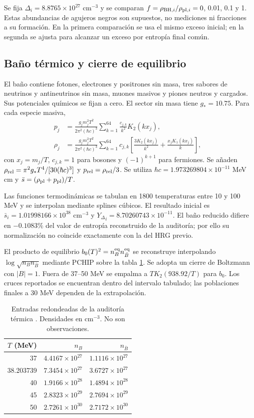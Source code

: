 \documentclass[10pt,twocolumn,a4paper]{article}
\newcommand{\Y}{{Y_\Delta}}
\newcommand{\sbar}{\bar s}
\begin{document}
Se fija $\Delta_i=8.8765\times10^{27}$ cm$^{-3}$ y se comparan $f=\rho_{{\rm BH},i}/\rho_{{\rm pl},i}=0$, 0.01, 0.1 y 1. Estas abundancias de agujeros negros son supuestos, no mediciones ni fracciones a su formación. En la primera comparación se usa el mismo exceso inicial; en la segunda se ajusta para alcanzar un exceso por entropía final común.

\subsection{Baño térmico y cierre de equilibrio}
El baño contiene fotones, electrones y positrones sin masa, tres sabores de neutrinos y antineutrinos sin masa, muones masivos y piones neutros y cargados. Sus potenciales químicos se fijan a cero. El sector sin masa tiene $g_*=10.75$. Para cada especie masiva,
\begin{align}
p_j&=\frac{g_jm_j^2T^2}{2\pi^2(\hbar c)^3}
\sum_{k=1}^{64}\frac{c_{j,k}}{k^2}K_2(kx_j),\\
\rho_j&=\frac{g_jm_j^2T^2}{2\pi^2(\hbar c)^3}
\sum_{k=1}^{64}c_{j,k}\left[\frac{3K_2(kx_j)}{k^2}+\frac{x_jK_1(kx_j)}{k}\right],
\end{align}
con $x_j=m_j/T$, $c_{j,k}=1$ para bosones y $(-1)^{k+1}$ para fermiones. Se añaden $\rho_{\rm rel}=\pi^2g_*T^4/[30(\hbar c)^3]$ y $p_{\rm rel}=\rho_{\rm rel}/3$. Se utiliza $\hbar c=1.973269804\times10^{-11}$ MeV cm y $\sbar=(\rho_{\rm pl}+p_{\rm pl})/T$.

Las funciones termodinámicas se tabulan en 1800 temperaturas entre 10 y 100 MeV y se interpolan mediante splines cúbicos. El resultado inicial es $\sbar_i=1.01998166\times10^{38}$ cm$^{-3}$ y $\Y_i=8.70260743\times10^{-11}$. El baño reducido difiere en $-0.1083\%$ del valor de entropía reconstruido de la auditoría; por ello su normalización no coincide exactamente con la del HRG previo.

El producto de equilibrio $b_0(T)^2=n_B^{\rm eq}n_{\bar B}^{\rm eq}$ se reconstruye interpolando $\log\sqrt{n_Bn_{\bar B}}$ mediante PCHIP sobre la tabla \ref{tab:input}. Se adopta un cierre de Boltzmann con $|B|=1$. Fuera de 37--50 MeV se empalma a $T K_2(938.92/T)$ para $b_0$. Los cruces reportados se encuentran dentro del intervalo tabulado; las poblaciones finales a 30 MeV dependen de la extrapolación.

\begin{table}[t]
\centering\small
\caption{Entradas redondeadas de la auditoría térmica \cite{garcia}. Densidades en cm$^{-3}$. No son observaciones.}\label{tab:input}
\begin{tabular}{rrr}\toprule
$T$ (MeV)&$n_B$&$n_{\bar B}$\\\midrule
37&$4.4167\times10^{27}$&$1.1116\times10^{27}$\\
38.203739&$7.3454\times10^{27}$&$3.6727\times10^{27}$\\
40&$1.9166\times10^{28}$&$1.4894\times10^{28}$\\
45&$2.8323\times10^{29}$&$2.7694\times10^{29}$\\
50&$2.7261\times10^{30}$&$2.7172\times10^{30}$\\\bottomrule
\end{tabular}
\end{table}
\end{document}
